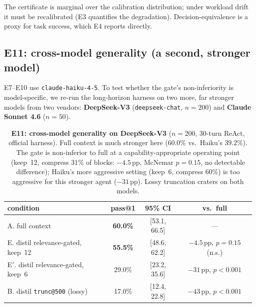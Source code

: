 \documentclass{article}
\begin{document}
The certificate is marginal over the calibration distribution; under workload drift
it must be recalibrated (E3 quantifies the degradation). Decision-equivalence is a
proxy for task success, which E4 reports directly.

\subsection{E11: cross-model generality (a second, stronger model)}
\label{sec:e11}

E7--E10 use \texttt{claude-haiku-4-5}. To test whether the gate's non-inferiority is
model-specific, we re-run the long-horizon harness on two more, far stronger models from two
vendors: \textbf{DeepSeek-V3} (\texttt{deepseek-chat}, $n{=}200$) and \textbf{Claude Sonnet 4.6}
($n{=}50$).

\begin{table}[h]
\centering\small
\begin{tabular}{@{}l c c c@{}}
\toprule
condition & pass@1 & 95\% CI & vs.\ full \\
\midrule
A. full context & \textbf{60.0\%} & [53.1, 66.5] & --- \\
E. distil relevance-gated, keep~12 & \textbf{55.5\%} & [48.6, 62.2] & $-4.5$\,pp, $p{=}0.15$ (n.s.) \\
E$'$. distil relevance-gated, keep~6 & 29.0\% & [23.2, 35.6] & $-31$\,pp, $p{<}0.001$ \\
B. distil \texttt{trunc@500} (lossy) & 17.0\% & [12.4, 22.8] & $-43$\,pp, $p{<}0.001$ \\
\bottomrule
\end{tabular}
\caption{\textbf{E11: cross-model generality on DeepSeek-V3} ($n{=}200$, 30-turn ReAct,
official harness). Full context is much stronger here ($60.0\%$ vs.\ Haiku's $39.2\%$). The
gate is non-inferior to full at a capability-appropriate operating point (keep~12, compress
$31\%$ of blocks: $-4.5$\,pp, McNemar $p{=}0.15$, no detectable difference); Haiku's more
aggressive setting (keep~6, compress $60\%$) is too aggressive for this stronger agent
($-31$\,pp). Lossy truncation craters on both models.}
\label{tab:e11}
\end{table}
\end{document}
